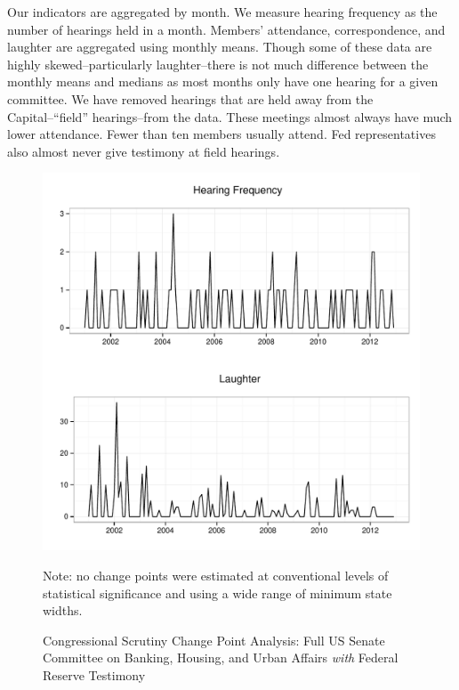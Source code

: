 \documentclass[a4paper]{article}\usepackage[]{graphicx}\usepackage[]{color}
\newenvironment{knitrout}{}{} %
\begin{document}
Our indicators are aggregated by month. We measure hearing frequency as the number of hearings held in a month. Members' attendance, correspondence, and laughter are aggregated using monthly means. Though some of these data are highly skewed--particularly laughter--there is not much difference between the monthly means and medians as most months only have one hearing for a given committee. We have removed hearings that are held away from the Capital--``field'' hearings--from the data. These meetings almost always have much lower attendance. Fewer than ten members usually attend. Fed representatives also almost never give testimony at field hearings.

\begin{figure}
    \caption{Congressional Scrutiny Change Point Analysis: Full US Senate Committee on Banking, Housing, and Urban Affairs \emph{with} Federal Reserve Testimony}
    \label{fig:SenateFedCP}
\begin{knitrout}
\color{fgcolor}

{\centering \includegraphics[width=0.8\linewidth]{figure/ScrutinySenate} 

}



\end{knitrout}
{\scriptsize{Note: no change points were estimated at conventional levels of statistical significance and using a wide range of minimum state widths.}}
\end{figure}
\end{document}
